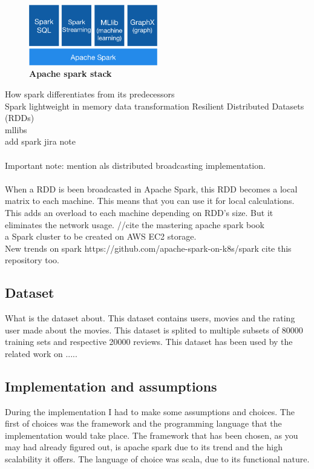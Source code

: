 \begin{figure}[ht]
  \centering
    \includegraphics[width=0.5\textwidth]{images/spark-stack.png}
    \caption{\bfseries Apache spark stack \cite{ApacheSpark:1}}
   \label{apacheSparkStack}
\end{figure}

How spark differentiates from its predecessors\\
Spark lightweight in memory data transformation 
Resilient Distributed Datasets (RDDs) \\
mllibs\\
add spark jira note \\\\
Important note: mention als distributed broadcasting implementation. 
\\\\
When a RDD is been broadcasted in Apache Spark, this RDD becomes a local matrix to each machine. This means that you can use it for local calculations. This adds an overload to each machine depending on RDD's size. But it eliminates the network usage.
//cite the mastering apache spark book
\cite{ApacheSpark:1} \\
a Spark cluster to be created on AWS EC2 storage.\\
New trends on spark https://github.com/apache-spark-on-k8s/spark cite this repository too.
\subsection{Dataset}
What is the dataset about. This dataset contains users, movies and the rating user made about the movies.
This dataset is splited to multiple subsets of 80000 training sets and respective 20000 reviews.
This dataset has been used by the related work on .....
\cite{MovieLens:3}

\subsection{Implementation and assumptions}
During the implementation I had to make some assumptions and choices. The first of choices was the framework and the programming language that the implementation would take place. The framework that has been chosen, as you may had already figured out, is apache spark due to its trend and the high scalability it offers. The language of choice was scala, due to its functional nature.
